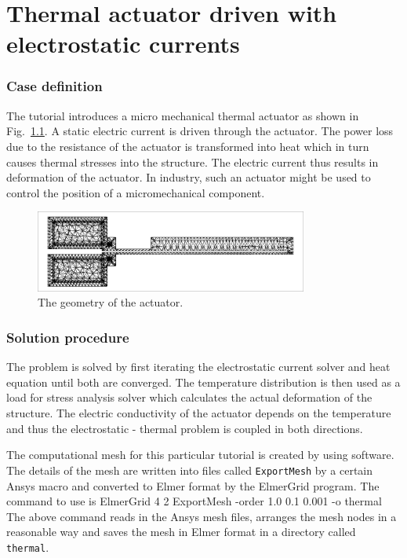 \chapter{Thermal actuator driven with electrostatic currents}


\subsection*{Case definition}

The tutorial introduces a micro mechanical thermal actuator as shown
in Fig.~\ref{geom_thermal}. A static electric current is driven
through the actuator. The power loss due to the resistance of the
actuator is transformed into heat which in turn causes thermal
stresses into the structure. The electric current thus results in
deformation of the actuator. In industry, such an actuator might be
used to control the position of a micromechanical component.

\begin{figure}[h]
  \centerline{\includegraphics[width=0.8\textwidth]{geometry_wh}}
  \caption{The geometry of the actuator.} 
  \label{geom_thermal}
\end{figure}


\subsection*{Solution procedure}

The problem is solved by first iterating the electrostatic current
solver and heat equation until both are converged. The temperature
distribution is then used as a load for stress analysis solver which
calculates the actual deformation of the structure. The electric
conductivity of the actuator depends on the temperature and thus the
electrostatic - thermal problem is coupled in both directions.

The computational mesh for this particular tutorial is created by
using  software. The details of the mesh are written into
files called \texttt{ExportMesh} by a certain Ansys macro and
converted to Elmer format by the ElmerGrid program. The command to use
is
\ttbegin
ElmerGrid 4 2 ExportMesh -order 1.0 0.1 0.001 -o thermal
\ttend 
The above command reads in the Ansys mesh files, arranges the mesh 
nodes in a reasonable way and saves the mesh in Elmer format in a
directory called \texttt{thermal}.

